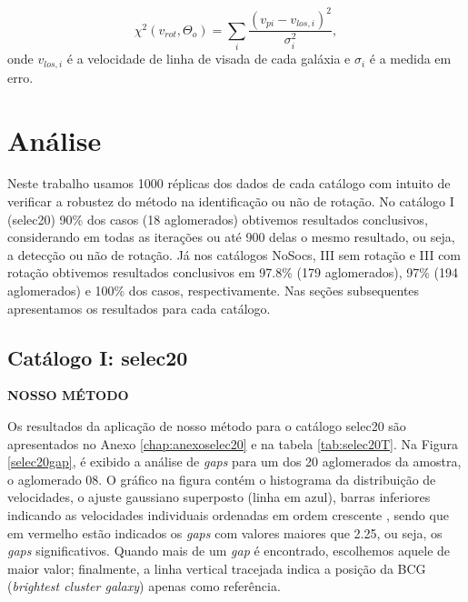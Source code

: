 \begin{equation}
 \chi^2 (v_{rot}, \Theta_o) = \sum_i{\frac{(v_{pi} - v_{los, i})^2}{\sigma^{2}_{i}}} ,
 \label{hwanglee2}
\end{equation}
onde $v_{los, i}$ é a velocidade de linha de visada de cada galáxia e $\sigma_i$ é a medida em erro.

\chapter{Análise}

Neste trabalho usamos 1000 réplicas dos dados de cada catálogo com intuito de verificar a robustez do método na identificação ou não de rotação. No catálogo I (selec20) 90\% dos casos (18 aglomerados) obtivemos resultados conclusivos, considerando em todas as iterações ou até 900 delas o mesmo resultado, ou seja, a detecção ou não de rotação. Já nos catálogos NoSocs, III sem rotação e III com rotação obtivemos resultados conclusivos em 97.8\% (179 aglomerados), 97\% (194 aglomerados) e 100\% dos casos, respectivamente. Nas seções subsequentes apresentamos os resultados para cada catálogo.     

\section{Catálogo I: selec20}
\textbf{NOSSO MÉTODO}

Os resultados da aplicação de nosso método para o catálogo selec20 são apresentados no Anexo \ref{chap:anexoselec20} e na tabela \ref{tab:selec20T}. Na Figura \ref{selec20gap}, é exibido a análise de \textit{gaps} para um dos 20 aglomerados da amostra, o aglomerado 08. O gráfico na figura contém o histograma da distribuição de velocidades, o ajuste gaussiano superposto (linha em azul), barras inferiores indicando as velocidades individuais ordenadas em ordem crescente , sendo que em vermelho estão indicados os \textit{gaps} com valores maiores que 2.25, ou seja, os \textit{gaps} significativos. Quando mais de um \textit{gap} é encontrado, escolhemos aquele de maior valor; finalmente, a linha vertical tracejada indica a posição da BCG (\textit{brightest cluster galaxy}) apenas como referência. 

